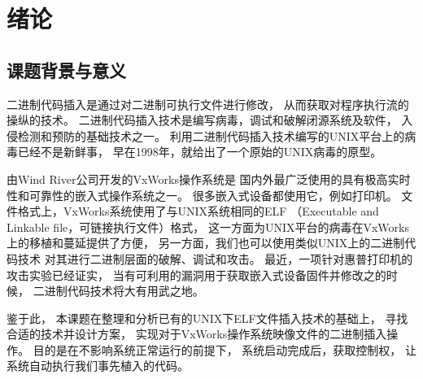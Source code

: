\chapter{绪论}

%
%
%

\section{课题背景与意义}

二进制代码插入是通过对二进制可执行文件进行修改，
从而获取对程序执行流的操纵的技术。
二进制代码插入技术是编写病毒，调试和破解闭源系统及软件，
入侵检测和预防的基础技术之一。
利用二进制代码插入技术编写的UNIX平台上的病毒已经不是新鲜事，
早在1998年，\cite{silvio}就给出了一个原始的UNIX病毒的原型。

由Wind River公司开发的VxWorks操作系统是
国内外最广泛使用的具有极高实时性和可靠性的嵌入式操作系统之一。
很多嵌入式设备都使用它，例如打印机。
文件格式上，VxWorks系统使用了与UNIX系统相同的ELF
（Executable and Linkable file，可链接执行文件）格式，
这一方面为UNIX平台的病毒在VxWorks上的移植和蔓延提供了方便，
另一方面，我们也可以使用类似UNIX上的二进制代码技术
对其进行二进制层面的破解、调试和攻击。
最近，一项针对惠普打印机的攻击实验已经证实，
当有可利用的漏洞用于获取嵌入式设备固件并修改之的时候，
二进制代码技术将大有用武之地。


鉴于此，
本课题在整理和分析已有的UNIX下ELF文件插入技术的基础上，
寻找合适的技术并设计方案，
实现对于VxWorks操作系统映像文件的二进制插入操作。
目的是在不影响系统正常运行的前提下，
系统启动完成后，获取控制权，
让系统自动执行我们事先植入的代码。

